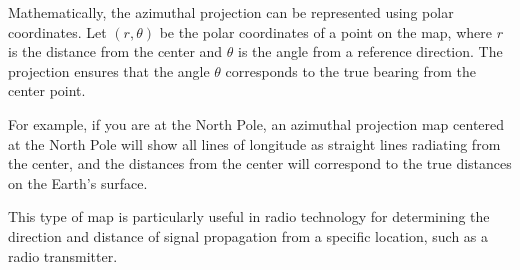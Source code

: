 Mathematically, the azimuthal projection can be represented using polar coordinates. Let \((r, \theta)\) be the polar coordinates of a point on the map, where \(r\) is the distance from the center and \(\theta\) is the angle from a reference direction. The projection ensures that the angle \(\theta\) corresponds to the true bearing from the center point.

For example, if you are at the North Pole, an azimuthal projection map centered at the North Pole will show all lines of longitude as straight lines radiating from the center, and the distances from the center will correspond to the true distances on the Earth's surface.

This type of map is particularly useful in radio technology for determining the direction and distance of signal propagation from a specific location, such as a radio transmitter.

